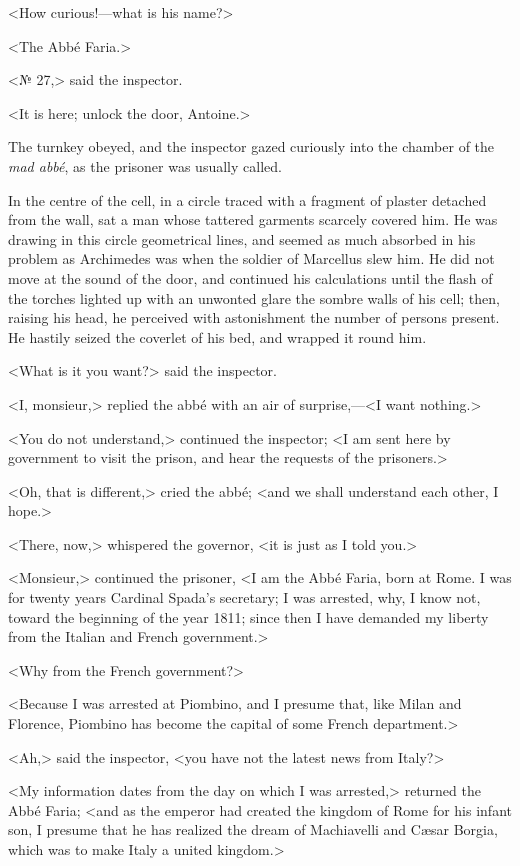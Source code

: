  <How curious!—what is his name?> 

 <The Abbé Faria.> 

 <№ 27,> said the inspector. 

 <It is here; unlock the door, Antoine.> 

 The turnkey obeyed, and the inspector gazed curiously into the chamber of the \textit{mad abbé}, as the prisoner was usually called. 

 In the centre of the cell, in a circle traced with a fragment of plaster detached from the wall, sat a man whose tattered garments scarcely covered him. He was drawing in this circle geometrical lines, and seemed as much absorbed in his problem as Archimedes was when the soldier of Marcellus slew him. He did not move at the sound of the door, and continued his calculations until the flash of the torches lighted up with an unwonted glare the sombre walls of his cell; then, raising his head, he perceived with astonishment the number of persons present. He hastily seized the coverlet of his bed, and wrapped it round him. 

 <What is it you want?> said the inspector. 

 <I, monsieur,> replied the abbé with an air of surprise,—<I want nothing.> 

 <You do not understand,> continued the inspector; <I am sent here by government to visit the prison, and hear the requests of the prisoners.> 

 <Oh, that is different,> cried the abbé; <and we shall understand each other, I hope.> 

 <There, now,> whispered the governor, <it is just as I told you.> 

 <Monsieur,> continued the prisoner, <I am the Abbé Faria, born at Rome. I was for twenty years Cardinal Spada's secretary; I was arrested, why, I know not, toward the beginning of the year 1811; since then I have demanded my liberty from the Italian and French government.> 

 <Why from the French government?> 

 <Because I was arrested at Piombino, and I presume that, like Milan and Florence, Piombino has become the capital of some French department.> 

 <Ah,> said the inspector, <you have not the latest news from Italy?> 

 <My information dates from the day on which I was arrested,> returned the Abbé Faria; <and as the emperor had created the kingdom of Rome for his infant son, I presume that he has realized the dream of Machiavelli and Cæsar Borgia, which was to make Italy a united kingdom.> 

